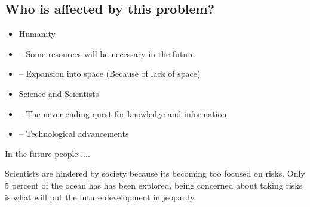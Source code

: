 \subsection{Who is affected by this problem?}
\begin{itemize}
	\item Humanity
	\item -- Some resources will be necessary in the future
	\item -- Expansion into space (Because of lack of space)
	\item Science and Scientists
	\item -- The never-ending quest for knowledge and information
	\item -- Technological advancements
\end{itemize}

In the future people .... 

Scientists are hindered by society because its becoming too focused on risks. Only 5 percent of the ocean has has been explored, being concerned about taking risks is what will put the future development in jeopardy. 
